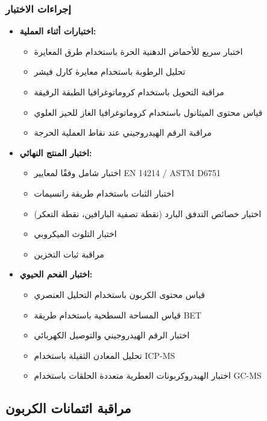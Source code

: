 \subsubsection{إجراءات الاختبار}
\begin{itemize}
    \item \textbf{اختبارات أثناء العملية:}
    \begin{itemize}
        \item اختبار سريع للأحماض الدهنية الحرة باستخدام طرق المعايرة
        \item تحليل الرطوبة باستخدام معايرة كارل فيشر
        \item مراقبة التحويل باستخدام كروماتوغرافيا الطبقة الرقيقة
        \item قياس محتوى الميثانول باستخدام كروماتوغرافيا الغاز للحيز العلوي
        \item مراقبة الرقم الهيدروجيني عند نقاط العملية الحرجة
    \end{itemize}
    
    \item \textbf{اختبار المنتج النهائي:}
    \begin{itemize}
        \item اختبار شامل وفقًا لمعايير EN 14214 / ASTM D6751
        \item اختبار الثبات باستخدام طريقة رانسيمات
        \item اختبار خصائص التدفق البارد (نقطة تصفية البارافين، نقطة التعكر)
        \item اختبار التلوث الميكروبي
        \item مراقبة ثبات التخزين
    \end{itemize}
    
    \item \textbf{اختبار الفحم الحيوي:}
    \begin{itemize}
        \item قياس محتوى الكربون باستخدام التحليل العنصري
        \item قياس المساحة السطحية باستخدام طريقة BET
        \item اختبار الرقم الهيدروجيني والتوصيل الكهربائي
        \item تحليل المعادن الثقيلة باستخدام ICP-MS
        \item اختبار الهيدروكربونات العطرية متعددة الحلقات باستخدام GC-MS
    \end{itemize}
\end{itemize}

\subsection{مراقبة ائتمانات الكربون}

